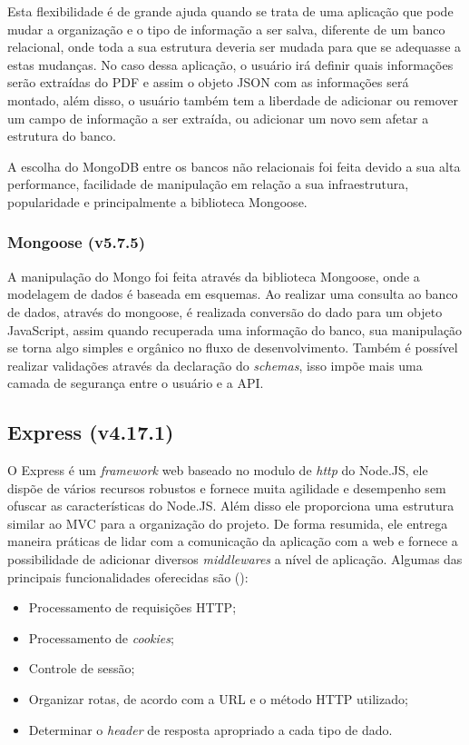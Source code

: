 Esta flexibilidade é de grande ajuda quando se trata de uma aplicação que pode mudar a organização e o tipo de informação a ser salva, diferente de um banco relacional, onde toda a sua estrutura deveria ser mudada para que se adequasse a estas mudanças. No caso dessa aplicação, o usuário irá definir quais informações serão extraídas do PDF e assim o objeto JSON com as informações será montado, além disso, o usuário também tem a liberdade de adicionar ou remover um campo de informação a ser extraída, ou adicionar um novo sem afetar a estrutura do banco.

A escolha do MongoDB entre os bancos não relacionais foi feita devido a sua alta performance, facilidade de manipulação em relação a sua infraestrutura, popularidade e principalmente a biblioteca Mongoose. 

\subsubsection{Mongoose (v5.7.5)}

A manipulação do Mongo foi feita através da biblioteca Mongoose, onde a modelagem de dados é baseada em esquemas. Ao realizar uma consulta ao banco de dados, através do mongoose, é realizada conversão do dado para um objeto JavaScript, assim quando recuperada uma informação do banco, sua manipulação se torna algo simples e orgânico no fluxo de desenvolvimento. Também é possível realizar validações através da declaração do \textit{schemas}, isso impõe mais uma camada de segurança entre o usuário e a API. 

\subsection{Express (v4.17.1)}

O Express é um \textit{framework} web baseado no modulo de \textit{http} do Node.JS, ele dispõe de vários recursos robustos e fornece muita agilidade e desempenho sem ofuscar as características do Node.JS. Além disso ele proporciona uma estrutura similar ao MVC para a organização do projeto. De forma resumida, ele entrega maneira práticas de lidar com a comunicação da aplicação com a web e fornece a possibilidade de adicionar diversos \textit{middlewares} a nível de aplicação. Algumas das principais funcionalidades oferecidas são (\cite{mardan2014express}):

\begin{itemize}
    \item Processamento de requisições HTTP;
    \item Processamento de \textit{cookies};
    \item Controle de sessão;
    \item Organizar rotas, de acordo com a URL e o método HTTP utilizado;
    \item Determinar o \textit{header} de resposta apropriado a cada tipo de dado.
\end{itemize}

